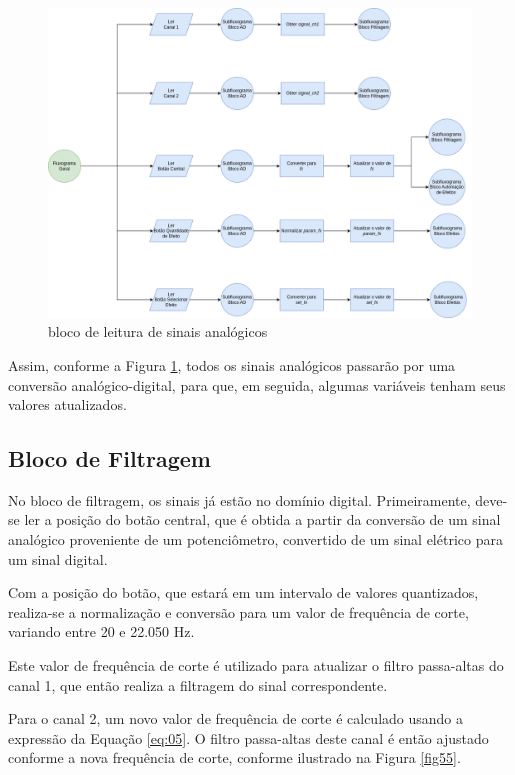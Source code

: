 \begin{figure}[h]
    \centering
    \includegraphics[width=\textwidth]{figuras/fig54.png}
    \caption{bloco de leitura de sinais analógicos}
    \label{fig54}
\end{figure}

Assim, conforme a Figura \ref{fig54}, todos os sinais analógicos passarão por uma conversão analógico-digital, para que, em seguida, algumas variáveis tenham seus valores atualizados.

\subsection{Bloco de Filtragem}

No bloco de filtragem, os sinais já estão no domínio digital. Primeiramente, deve-se ler a posição do botão central, que é obtida a partir da conversão de um sinal analógico proveniente de um potenciômetro, convertido de um sinal elétrico para um sinal digital.

Com a posição do botão, que estará em um intervalo de valores quantizados, realiza-se a normalização e conversão para um valor de frequência de corte, variando entre 20 e 22.050 Hz.

Este valor de frequência de corte é utilizado para atualizar o filtro passa-altas do canal 1, que então realiza a filtragem do sinal correspondente.

Para o canal 2, um novo valor de frequência de corte é calculado usando a expressão da Equação \ref{eq:05}. O filtro passa-altas deste canal é então ajustado conforme a nova frequência de corte, conforme ilustrado na Figura \ref{fig55}.

